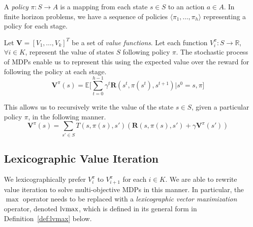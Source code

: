 A \emph{policy} $\pi : S \rightarrow A$ is a mapping from each state $s \in S$ to an action $a \in A$. In finite horizon problems, we have a sequence of policies $\langle \pi_1, \ldots, \pi_h \rangle$ representing a policy for each stage.

Let $\mathbf{V} = [V_1, \ldots, V_k]^T$ be a set of \emph{value functions}. Let each function $V_i^\pi : S \rightarrow \mathbb{R}$, $\forall i \in K$, represent the value of states $S$ following policy $\pi$. The stochastic process of MDPs enable us to represent this using the expected value over the reward for following the policy at each stage.
\begin{equation*}
    \mathbf{V}^\pi(s) = \mathbb{E} \Big[ \sum_{t=0}^{h-1} \gamma^t \mathbf{R}(s^t, \pi(s^t), s^{t+1}) \Big| s^0 = s, \pi \Big]
\end{equation*}

This allows us to recursively write the value of the state $s \in S$, given a particular policy $\pi$, in the following manner.
\begin{equation*}
    \mathbf{V}^\pi(s) = \sum_{s' \in S} T(s, \pi(s), s') (\mathbf{R}(s, \pi(s), s') + \gamma \mathbf{V}^\pi(s'))
\end{equation*}


\subsection{Lexicographic Value Iteration}

We lexicographically prefer $V_i^\pi$ to $V_{i+1}^\pi$ for each $i \in K$. We are able to rewrite value iteration to solve multi-objective MDPs in this manner. In particular, the $\max$ operator needs to be replaced with a \emph{lexicographic vector maximization} operator, denoted $\operatorname*{lvmax}$, which is defined in its general form in Definition~\ref{def:lvmax} below.

